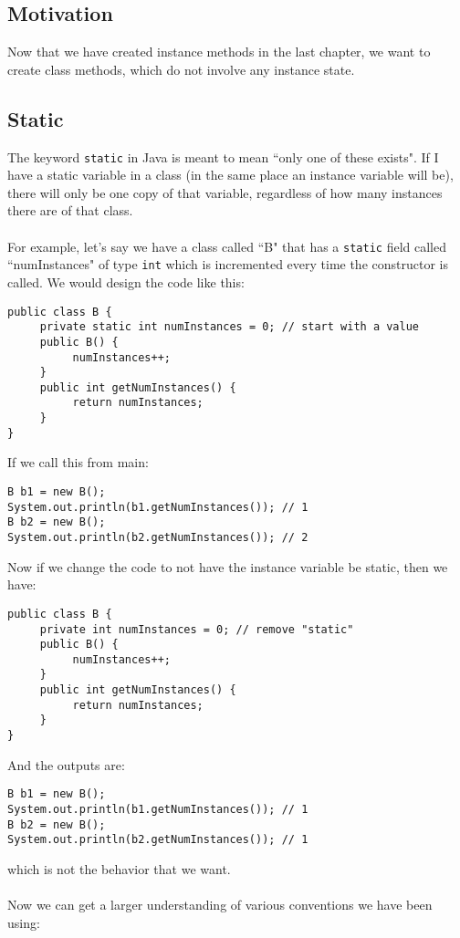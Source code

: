 
\subsection{Motivation}
Now that we have created instance methods in the last chapter, we want to create class methods, which do not involve any instance state.

\subsection{Static}
The keyword \verb|static| in Java is meant to mean ``only one of these exists". If I have a static variable in a class (in the same place an instance variable will be), there will only be one copy of that variable, regardless of how many instances there are of that class.
\\ \\
For example, let's say we have a class called ``B" that has a \verb|static| field called ``numInstances" of type \verb|int| which is incremented every time the constructor is called. We would design the code like this:
\begin{lstlisting}
public class B {
     private static int numInstances = 0; // start with a value
     public B() {
          numInstances++;
     }
     public int getNumInstances() {
          return numInstances;
     }
}
\end{lstlisting}
If we call this from main:
\begin{lstlisting}
B b1 = new B();
System.out.println(b1.getNumInstances()); // 1
B b2 = new B();
System.out.println(b2.getNumInstances()); // 2
\end{lstlisting}
Now if we change the code to not have the instance variable be static, then we have:
\begin{lstlisting}
public class B {
     private int numInstances = 0; // remove "static"
     public B() {
          numInstances++;
     }
     public int getNumInstances() {
          return numInstances;
     }
}
\end{lstlisting}
And the outputs are:
\begin{lstlisting}
B b1 = new B();
System.out.println(b1.getNumInstances()); // 1
B b2 = new B();
System.out.println(b2.getNumInstances()); // 1
\end{lstlisting}
which is not the behavior that we want.
\\ \\
Now we can get a larger understanding of various conventions we have been using:
